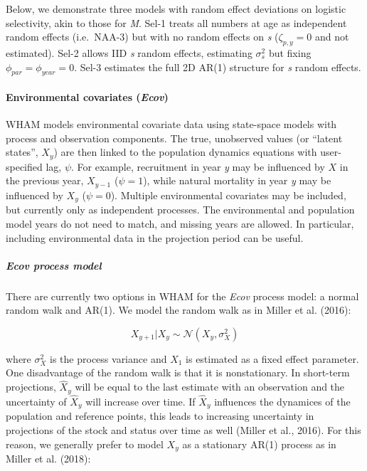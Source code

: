 \documentclass[]{article}
\let\oldparagraph\paragraph
\renewcommand{\paragraph}[1]{\oldparagraph{#1}\mbox{}}
\let\oldsubparagraph\subparagraph
\renewcommand{\subparagraph}[1]{\oldsubparagraph{#1}\mbox{}}
\begin{document}
Below, we demonstrate three models with random effect deviations on
logistic selectivity, akin to those for \emph{M}. Sel-1 treats all
numbers at age as independent random effects (i.e.~NAA-3) but with no
random effects on \emph{s} (\(\zeta_{p,y} = 0\) and not estimated).
Sel-2 allows IID \emph{s} random effects, estimating \(\sigma^2_s\) but
fixing \(\phi_{par} = \phi_{year} = 0\). Sel-3 estimates the full 2D
AR(1) structure for \emph{s} random effects.

\hypertarget{environmental-covariates-ecov}{%
\paragraph{\texorpdfstring{Environmental covariates
(\emph{Ecov})}{Environmental covariates (Ecov)}}\label{environmental-covariates-ecov}}

WHAM models environmental covariate data using state-space models with
process and observation components. The true, unobserved values (or
``latent states'', \(X_y\)) are then linked to the population dynamics
equations with user-specified lag, \(\psi\). For example, recruitment in
year \emph{y} may be influenced by \(X\) in the previous year,
\(X_{y-1}\) (\(\psi = 1\)), while natural mortality in year \emph{y} may
be influenced by \(X_y\) (\(\psi = 0\)). Multiple environmental
covariates may be included, but currently only as independent processes.
The environmental and population model years do not need to match, and
missing years are allowed. In particular, including environmental data
in the projection period can be useful.

\hypertarget{ecov-process-model}{%
\subparagraph{\texorpdfstring{\emph{Ecov} process
model}{Ecov process model}}\label{ecov-process-model}}

There are currently two options in WHAM for the \emph{Ecov} process
model: a normal random walk and AR(1). We model the random walk as in
Miller et al. (2016):

\[X_{y+1} | X_y \sim \mathcal{N}\left( X_y, \sigma^2_X\right)\]

where \(\sigma^2_X\) is the process variance and \(X_1\) is estimated as
a fixed effect parameter. One disadvantage of the random walk is that it
is nonstationary. In short-term projections, \(\hat{X}_y\) will be equal
to the last estimate with an observation and the uncertainty of
\(\hat{X}_y\) will increase over time. If \(\hat{X}_y\) influences the
dynamices of the population and reference points, this leads to
increasing uncertainty in projections of the stock and status over time
as well (Miller et al., 2016). For this reason, we generally prefer to
model \(X_y\) as a stationary AR(1) process as in Miller et al. (2018):
\end{document}

